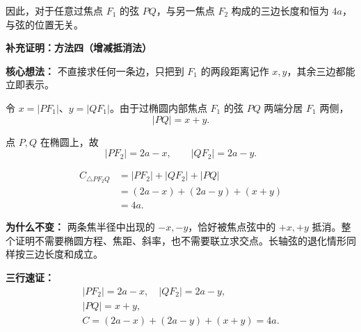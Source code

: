 \begin{proofbox}
	因此，对于任意过焦点 $F_1$ 的弦 $PQ$，与另一焦点 $F_2$ 构成的三边长度和恒为 $4a$，与弦的位置无关。


\medskip
\textbf{\textcolor{CProof}{补充证明：方法四（增减抵消法）}}

\textbf{核心想法：} 不直接求任何一条边，只把到 $F_1$ 的两段距离记作 $x,y$，其余三边都能立即表示。

\begin{description}[style=nextline, leftmargin=2.8em, labelsep=0.5em, itemsep=0.45em]
 \item[\textbf{第一步（设两段）：}]
  令 $x=|PF_1|$、$y=|QF_1|$。由于过椭圆内部焦点 $F_1$ 的弦 $PQ$ 两端分居 $F_1$ 两侧，
  \[
   |PQ|=x+y.
  \]
 \item[\textbf{第二步（定义相减）：}]
  点 $P,Q$ 在椭圆上，故
  \[
   |PF_2|=2a-x,\qquad |QF_2|=2a-y.
  \]
 \item[\textbf{第三步（直接抵消）：}]
  \[
  \begin{aligned}
   C_{\triangle PF_2Q}
   &=|PF_2|+|QF_2|+|PQ|\\
   &=(2a-x)+(2a-y)+(x+y)\\
   &=\boxed{4a}.
  \end{aligned}
  \]
\end{description}

\textbf{为什么不变：} 两条焦半径中出现的 $-x,-y$，恰好被焦点弦中的 $+x,+y$ 抵消。整个证明不需要椭圆方程、焦距、斜率，也不需要联立求交点。长轴弦的退化情形同样按三边长度和成立。

\textbf{三行速证：}
\[
 \begin{gathered}
 |PF_2|=2a-x,\quad |QF_2|=2a-y,\\
 |PQ|=x+y,\\
 C=(2a-x)+(2a-y)+(x+y)=4a.
 \end{gathered}
\]
\end{proofbox}
